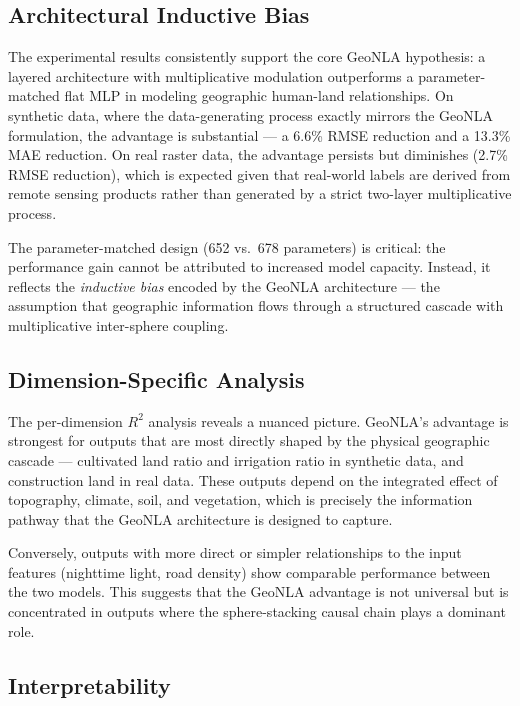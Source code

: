 \documentclass[a4paper,11pt]{article}
\begin{document}
\subsection{Architectural Inductive Bias}
\label{subsec:inductive_bias}

The experimental results consistently support the core GeoNLA hypothesis: a layered architecture with multiplicative modulation outperforms a parameter-matched flat MLP in modeling geographic human-land relationships. On synthetic data, where the data-generating process exactly mirrors the GeoNLA formulation, the advantage is substantial --- a 6.6\% RMSE reduction and a 13.3\% MAE reduction. On real raster data, the advantage persists but diminishes (2.7\% RMSE reduction), which is expected given that real-world labels are derived from remote sensing products rather than generated by a strict two-layer multiplicative process.

The parameter-matched design (652 vs.\ 678 parameters) is critical: the performance gain cannot be attributed to increased model capacity. Instead, it reflects the \emph{inductive bias} encoded by the GeoNLA architecture --- the assumption that geographic information flows through a structured cascade with multiplicative inter-sphere coupling.

\subsection{Dimension-Specific Analysis}
\label{subsec:dim_analysis}

The per-dimension $R^2$ analysis reveals a nuanced picture. GeoNLA's advantage is strongest for outputs that are most directly shaped by the physical geographic cascade --- cultivated land ratio and irrigation ratio in synthetic data, and construction land in real data. These outputs depend on the integrated effect of topography, climate, soil, and vegetation, which is precisely the information pathway that the GeoNLA architecture is designed to capture.

Conversely, outputs with more direct or simpler relationships to the input features (nighttime light, road density) show comparable performance between the two models. This suggests that the GeoNLA advantage is not universal but is concentrated in outputs where the sphere-stacking causal chain plays a dominant role.

\subsection{Interpretability}
\label{subsec:interpretability}
\end{document}
